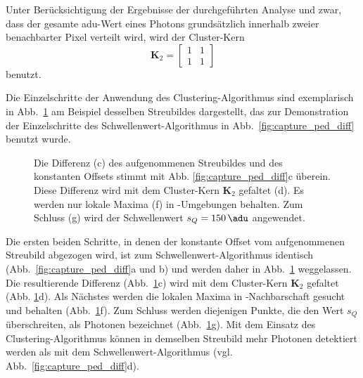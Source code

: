 \noindent
Unter Berücksichtigung der Ergebnisse der durchgeführten Analyse und zwar, dass der gesamte \gls{adu}-Wert eines Photons grundsätzlich innerhalb zweier benachbarter Pixel verteilt wird, wird der Cluster-Kern
\begin{equation}
    \mathbf{K}_2 = \begin{bmatrix}
1 & 1\\
1 & 1
\end{bmatrix}
\end{equation}
benutzt.

\noindent
Die Einzelschritte der Anwendung des Clustering-Algorithmus sind exemplarisch in Abb.~\ref{fig:capture_ped_diff_clustering} am Beispiel desselben Streubildes dargestellt, das zur Demonstration der Einzelschritte des Schwellen\-wert-Algorithmus in Abb.~\ref{fig:capture_ped_diff} benutzt wurde.
\begin{figure}[H]
    \centering
    
    \caption{Die Differenz (c) des aufgenommenen Streubildes und des konstanten Offsets stimmt mit Abb. \ref{fig:capture_ped_diff}c überein. Diese Differenz wird mit dem Cluster-Kern $\mathbf{K}_2$ gefaltet (d). Es werden nur lokale Maxima (f) in -Umgebungen behalten. Zum Schluss (g) wird der Schwellenwert $s_Q = \SI{150}{\adu}$ angewendet.}
    \label{fig:capture_ped_diff_clustering}
\end{figure}
\noindent
Die ersten beiden Schritte, in denen der konstante Offset vom aufgenommenen Streubild abgezogen wird, ist zum Schwellenwert-Algorithmus identisch (Abb.~\ref{fig:capture_ped_diff}a und b) und werden daher in Abb.~\ref{fig:capture_ped_diff_clustering} weggelassen. Die resultierende Differenz (Abb.~\ref{fig:capture_ped_diff_clustering}c) wird mit dem Cluster-Kern  $\mathbf{K}_2$ gefaltet (Abb. \ref{fig:capture_ped_diff_clustering}d). Als Nächstes werden die lokalen Maxima in -Nachbarschaft gesucht und behalten (Abb.~\ref{fig:capture_ped_diff_clustering}f). Zum Schluss werden diejenigen Punkte, die den Wert $s_Q$ überschreiten, als Photonen bezeichnet (Abb.~\ref{fig:capture_ped_diff_clustering}g). Mit dem Einsatz des Clustering-Algorithmus können in demselben Streubild mehr Photonen detektiert werden als mit dem Schwellenwert-Algorithmus (vgl. Abb.~\ref{fig:capture_ped_diff}d).


